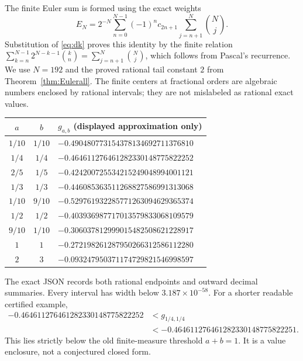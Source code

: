 \documentclass[11pt]{article}
\numberwithin{equation}{section}
\theoremstyle{definition}
\theoremstyle{remark}
\begin{document}
The finite Euler sum is formed using the exact weights
\begin{equation}\label{eq:finiteweights}
 E_N=2^{-N}\sum_{n=0}^{N-1}(-1)^n c_{2n+1}
                         \sum_{j=n+1}^{N}\binom Nj.
\end{equation}
Substitution of \eqref{eq:dk} proves this identity by the finite relation
$\sum_{k=n}^{N-1}2^{N-k-1}\binom kn=\sum_{j=n+1}^N\binom Nj$,
which follows from Pascal's recurrence. We use $N=192$ and the proved
rational tail constant $2$ from Theorem~\ref{thm:Eulerall}. The finite
centers at fractional orders are algebraic numbers enclosed by rational
intervals; they are not mislabeled as rational exact values.

\begin{center}
\small
\begin{tabular}{@{}c c l@{}}
\toprule
$a$ & $b$ & $g_{a,b}$ (displayed approximation only)\\
\midrule
$1/10$ & $1/10$ & $-0.490480773154378134692711376810$\\
$1/4$ & $1/4$ & $-0.464611276461282330148775822252$\\
$2/5$ & $1/5$ & $-0.424200725534215249048994001121$\\
$1/3$ & $1/3$ & $-0.446085363511268827586991313068$\\
$1/10$ & $9/10$ & $-0.529761932285771263094629365374$\\
$1/2$ & $1/2$ & $-0.403936987717013579833068109579$\\
$9/10$ & $1/10$ & $-0.306037812999015482508621228917$\\
$1$ & $1$ & $-0.272198261287950266312586112280$\\
$2$ & $3$ & $-0.093247950371174729821546998597$\\
\bottomrule
\end{tabular}
\end{center}
The exact JSON records both rational endpoints and outward decimal
summaries. Every interval has width below $3.187\times10^{-58}$.
For a shorter readable certified example,
\begin{align*}
 -0.464611276461282330148775822252
 &<g_{1/4,1/4}\\
 &<-0.464611276461282330148775822251.
\end{align*}
This lies strictly below the old finite-measure threshold $a+b=1$.
It is a value enclosure, not a conjectured closed form.
\end{document}
